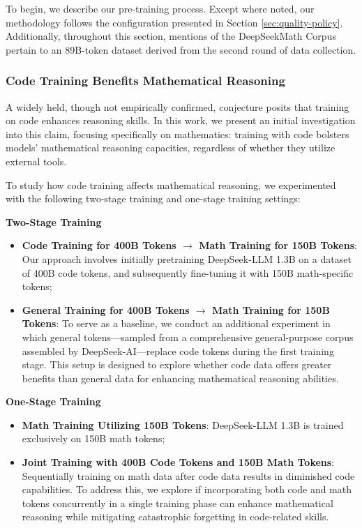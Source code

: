 \begin{itemize}[topsep=0pt]
\begin{itemize}[topsep=0pt]
To begin, we describe our pre-training process. Except where noted, our methodology follows the configuration presented in Section \ref{sec:quality-policy}. Additionally, throughout this section, mentions of the DeepSeekMath Corpus pertain to an 89B-token dataset derived from the second round of data collection.

\subsubsection{Code Training Benefits Mathematical Reasoning}

A widely held, though not empirically confirmed, conjecture posits that training on code enhances reasoning skills. In this work, we present an initial investigation into this claim, focusing specifically on mathematics: training with code bolsters models' mathematical reasoning capacities, regardless of whether they utilize external tools.

To study how code training affects mathematical reasoning, we experimented with the following two-stage training and one-stage training settings:

\textbf{Two-Stage Training}

\begin{itemize}[topsep=0pt]
    \item \textbf{Code Training for 400B Tokens $\rightarrow$ Math Training for 150B Tokens}: Our approach involves initially pretraining DeepSeek-LLM 1.3B on a dataset of 400B code tokens, and subsequently fine-tuning it with 150B math-specific tokens;
    \item \textbf{General Training for 400B Tokens $\rightarrow$ Math Training for 150B Tokens}: To serve as a baseline, we conduct an additional experiment in which general tokens—sampled from a comprehensive general-purpose corpus assembled by DeepSeek-AI—replace code tokens during the first training stage. This setup is designed to explore whether code data offers greater benefits than general data for enhancing mathematical reasoning abilities.
\end{itemize}

\textbf{One-Stage Training}

\begin{itemize}[topsep=0pt]
    \item \textbf{Math Training Utilizing 150B Tokens}: DeepSeek-LLM 1.3B is trained exclusively on 150B math tokens;
    \item \textbf{Joint Training with 400B Code Tokens and 150B Math Tokens}: Sequentially training on math data after code data results in diminished code capabilities. To address this, we explore if incorporating both code and math tokens concurrently in a single training phase can enhance mathematical reasoning while mitigating catastrophic forgetting in code-related skills.
\end{itemize}


\end{itemize}
\end{itemize}
